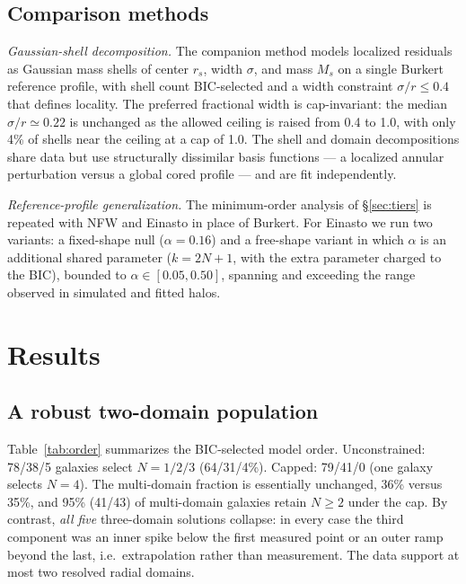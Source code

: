 \documentclass[twocolumn]{aastex701}
\begin{document}
\subsection{Comparison methods}

\emph{Gaussian-shell decomposition.} The companion method models localized
residuals as Gaussian mass shells of center $r_s$, width $\sigma$, and mass
$M_s$ on a single Burkert reference profile, with shell count BIC-selected and a width
constraint $\sigma/r \le 0.4$ that defines locality. The preferred fractional
width is cap-invariant: the median $\sigma/r \simeq 0.22$ is unchanged as the
allowed ceiling is raised from 0.4 to 1.0, with only 4\% of shells near the
ceiling at a cap of 1.0. The shell and domain decompositions share data but
use structurally dissimilar basis functions --- a localized annular perturbation
versus a global cored profile --- and are fit independently.

\emph{Reference-profile generalization.} The minimum-order analysis of
\S\ref{sec:tiers} is repeated with NFW and Einasto in place of Burkert. For
Einasto we run two variants: a fixed-shape null ($\alpha = 0.16$) and a
free-shape variant in which $\alpha$ is an additional shared parameter
($k = 2N + 1$, with the extra parameter charged to the BIC), bounded to
$\alpha \in [0.05, 0.50]$, spanning and exceeding the range observed in
simulated and fitted halos.

\section{Results} \label{sec:results}

\subsection{A robust two-domain population} \label{sec:twodomain}

Table~\ref{tab:order} summarizes the BIC-selected model order.
Unconstrained: 78/38/5 galaxies select $N = 1/2/3$ (64/31/4\%). Capped:
79/41/0 (one galaxy selects $N = 4$). The multi-domain fraction is
essentially unchanged, 36\% versus 35\%, and 95\% (41/43) of multi-domain
galaxies retain $N \ge 2$ under the cap. By contrast, \emph{all five}
three-domain solutions collapse: in every case the third component was an
inner spike below the first measured point or an outer ramp beyond the last,
i.e.\ extrapolation rather than measurement. The data support at most two
resolved radial domains.
\end{document}
